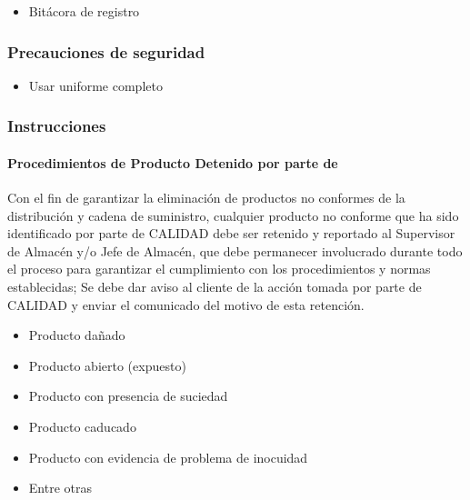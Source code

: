 \begin{itemize}
	\item Bitácora de registro
\end{itemize}

\subsubsection{Precauciones de seguridad}

\begin{itemize}
	\item Usar uniforme completo
\end{itemize}

\subsubsection{Instrucciones}

\paragraph{Procedimientos de Producto Detenido por parte de }

Con el fin de garantizar la eliminación de productos no conformes de la distribución y cadena de suministro, cualquier producto no conforme que ha sido identificado por parte de CALIDAD debe ser retenido y reportado al Supervisor de Almacén y/o Jefe de Almacén, que debe permanecer involucrado durante todo el proceso para garantizar el cumplimiento con los procedimientos y normas establecidas; Se debe dar aviso al cliente de la acción tomada por parte de CALIDAD y enviar el comunicado del motivo de esta retención.

\begin{itemize}
	\item Producto dañado
	\item Producto abierto (expuesto)
	\item Producto con presencia de suciedad
	\item Producto caducado
	\item Producto con evidencia de problema de inocuidad
	\item Entre otras
\end{itemize}

